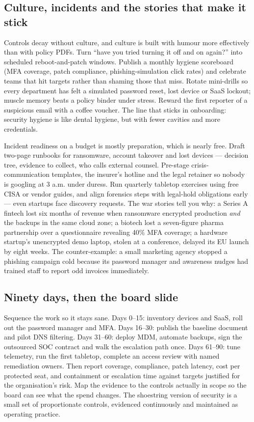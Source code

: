 \subsection{Culture, incidents and the stories that make it stick}


Controls decay without culture, and culture is built with humour more effectively than with policy PDFs. Turn ``have you tried turning it off and on again?'' into scheduled reboot-and-patch windows. Publish a monthly hygiene scoreboard (MFA coverage, patch compliance, phishing-simulation click rates) and celebrate teams that hit targets rather than shaming those that miss. Rotate mini-drills so every department has felt a simulated password reset, lost device or SaaS lockout; muscle memory beats a policy binder under stress. Reward the first reporter of a suspicious email with a coffee voucher. The line that sticks in onboarding: security hygiene is like dental hygiene, but with fewer cavities and more credentials.


Incident readiness on a budget is mostly preparation, which is nearly free. Draft two-page runbooks for ransomware, account takeover and lost devices — decision tree, evidence to collect, who calls external counsel. Pre-stage crisis-communication templates, the insurer's hotline and the legal retainer so nobody is googling at 3 a.m. under duress. Run quarterly tabletop exercises using free CISA or vendor guides, and align forensics steps with legal-hold obligations early — even startups face discovery requests. The war stories tell you why: a Series A fintech lost six months of revenue when ransomware encrypted production \emph{and} the backups in the same cloud zone; a biotech lost a seven-figure pharma partnership over a questionnaire revealing 40\% MFA coverage; a hardware startup's unencrypted demo laptop, stolen at a conference, delayed its EU launch by eight weeks. The counter-example: a small marketing agency stopped a phishing campaign cold because its password manager and awareness nudges had trained staff to report odd invoices immediately.



\subsection{Ninety days, then the board slide}


Sequence the work so it stays sane. Days 0–15: inventory devices and SaaS, roll out the password manager and MFA. Days 16–30: publish the baseline document and pilot DNS filtering. Days 31–60: deploy MDM, automate backups, sign the outsourced SOC contract and walk the escalation path once. Days 61–90: tune telemetry, run the first tabletop, complete an access review with named remediation owners. Then report coverage, compliance, patch latency, cost per protected seat, and containment or escalation time against targets justified for the organisation's risk. Map the evidence to the controls actually in scope so the board can see what the spend changes. The shoestring version of security is a small set of proportionate controls, evidenced continuously and maintained as operating practice. \autocite{nist-csf-small-business}

